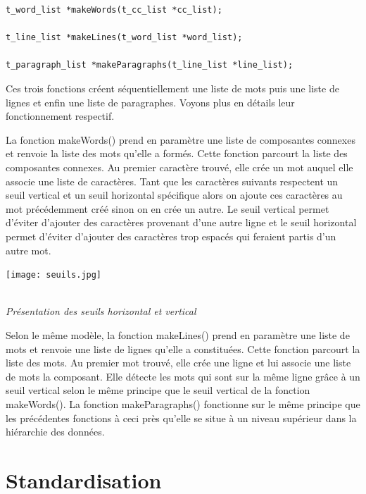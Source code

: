 \documentclass[a4paper,12pt]{report}
\begin{document}
\begin{lstlisting}
t_word_list *makeWords(t_cc_list *cc_list);

t_line_list *makeLines(t_word_list *word_list);

t_paragraph_list *makeParagraphs(t_line_list *line_list);
\end{lstlisting}

Ces trois fonctions créent séquentiellement une liste de mots puis une liste de lignes et
enfin une liste de paragraphes. Voyons plus en détails leur fonctionnement respectif.
   
La fonction makeWords() prend en paramètre une liste de composantes connexes et
renvoie la liste des mots qu'elle a formés. Cette fonction parcourt la liste des composantes
connexes. Au premier caractère trouvé, elle crée un mot auquel elle associe une liste de
caractères. Tant que les caractères suivants respectent un seuil vertical et un seuil
horizontal spécifique alors on ajoute ces caractères au mot précédemment créé sinon on en
crée un autre. Le seuil vertical permet d'éviter d'ajouter des caractères provenant d'une
autre ligne et le seuil horizontal permet d'éviter d'ajouter des caractères trop espacés qui
feraient partis d'un autre mot.

\begin{center}
  \texttt{[image: seuils.jpg]}
  \caption{\\\emph{Pr\'esentation des seuils horizontal et vertical}}
\end{center}

Selon le même modèle, la fonction makeLines() prend en paramètre une liste de mots et
renvoie une liste de lignes qu'elle a constituées. Cette fonction parcourt la liste des mots. Au
premier mot trouvé, elle crée une ligne et lui associe une liste de mots la composant. Elle
détecte les mots qui sont sur la même ligne grâce à un seuil vertical selon le même principe
que le seuil vertical de la fonction makeWords(). La fonction makeParagraphs() fonctionne
sur le même principe que les précédentes fonctions à ceci près qu'elle se situe à un niveau
supérieur dans la hiérarchie des données.



\section{Standardisation}
\end{document}
